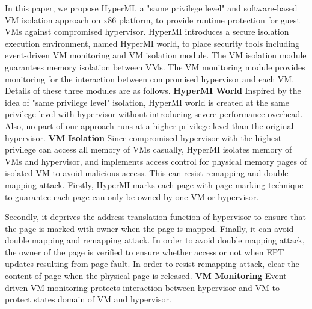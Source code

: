 \documentclass[conference]{IEEEtran}
\begin{document}
In this paper, we propose HyperMI, a "same privilege level" and software-based VM isolation approach on x86 platform, to provide runtime protection for guest VMs against compromised hypervisor. HyperMI introduces a secure isolation execution environment, named HyperMI world, to place security tools including event-driven VM monitoring and VM isolation module. The VM isolation module guarantees memory isolation between VMs. The VM monitoring module provides monitoring for the interaction between compromised hypervisor and each VM. 
Details of these three modules are as follows.
\textbf{HyperMI World}
Inspired by the idea of "same privilege level" isolation, HyperMI world is created at the same privilege level with hypervisor without introducing severe performance overhead. Also, no part of our approach runs at a higher privilege level than the original hypervisor.
\textbf{VM Isolation}
Since compromised hypervisor with the highest privilege can access all memory of VMs casually, HyperMI isolates memory of VMs and hypervisor, and implements access control for physical memory pages of isolated VM to avoid malicious access. This can resist remapping and double mapping attack.
Firstly, HyperMI marks each page with page marking technique to guarantee each page can only be owned by one VM or hypervisor.

Secondly, it deprives the address translation function of hypervisor to ensure that the page is marked with owner when the page is mapped. 
Finally, it can avoid double mapping and remapping attack. In order to avoid double mapping attack, the owner of the page is verified to ensure whether access or not when EPT updates resulting from page fault. In order to resist remapping attack, clear the content of page when the physical page is released.
\textbf{VM Monitoring}
Event-driven VM monitoring protects interaction between hypervisor and VM to protect states domain of VM and hypervisor.
\end{document}
